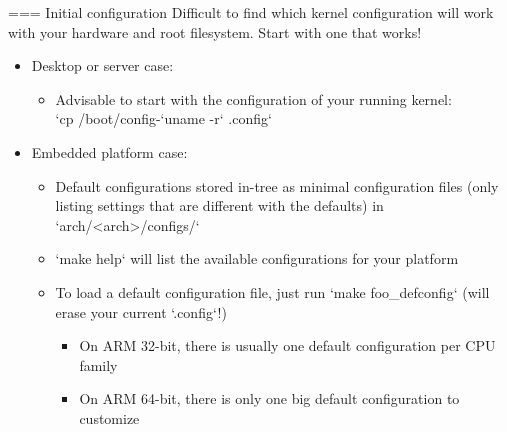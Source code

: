 === Initial configuration
  Difficult to find which kernel configuration will work
  with your hardware and root filesystem. Start with one
  that works!
  \begin{itemize}
  \item Desktop or server case:
     \begin{itemize}
       \item Advisable to start with the configuration of your running
	  kernel:\\
	  `cp /boot/config-`uname -r` .config`
     \end{itemize}
   \item Embedded platform case:
     \begin{itemize}
       \item Default configurations stored in-tree as minimal
         configuration files (only listing settings that are different
         with the defaults) in `arch/<arch>/configs/`
       \item `make help` will list the available configurations for
         your platform
       \item To load a default configuration file, just run
         `make foo_defconfig` (will erase your current
         `.config`!)
         \begin{itemize}
           \item On ARM 32-bit, there is usually one default
             configuration per CPU family
           \item On ARM 64-bit, there is only one big default
             configuration to customize
         \end{itemize}
     \end{itemize}
  \end{itemize}


